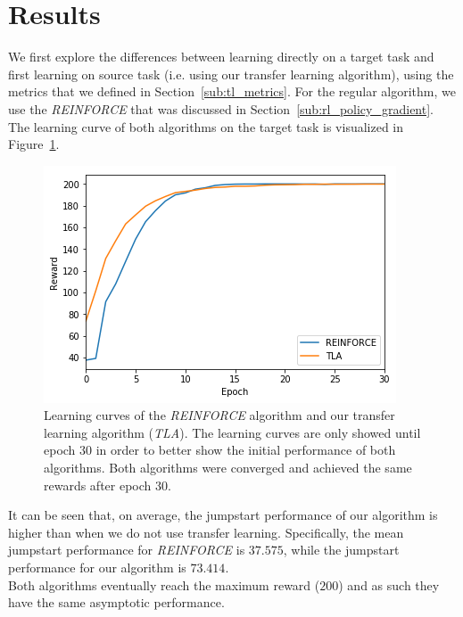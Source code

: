 \documentclass[a4paper, 11pt]{article}
\begin{document}
\section{Results}
We first explore the differences between learning directly on a target task and first learning on source task (i.e. using our transfer learning algorithm), using the metrics that we defined in Section~\ref{sub:tl_metrics}. For the regular algorithm, we use the \textit{REINFORCE} that was discussed in Section~\ref{sub:rl_policy_gradient}. The learning curve of both algorithms on the target task is visualized in Figure~\ref{fig:tla_re_5envs}.
\begin{figure}[H]
    \centering
    \includegraphics[width=.8\linewidth]{images/tla_re_target_5envs.png}
    \caption[Learning curves for \textit{REINFORCE} and \textit{TLA}]{Learning curves of the \textit{REINFORCE} algorithm and our transfer learning algorithm (\textit{TLA}). The learning curves are only showed until epoch 30 in order to better show the initial performance of both algorithms. Both algorithms were converged and achieved the same rewards after epoch 30.}
    \label{fig:tla_re_5envs}
\end{figure}
It can be seen that, on average, the jumpstart performance of our algorithm is higher than when we do not use transfer learning.
Specifically, the mean jumpstart performance for \textit{REINFORCE} is $37.575$, while the jumpstart performance for our algorithm is $73.414$.\\
Both algorithms eventually reach the maximum reward ($200$) and as such they have the same asymptotic performance.\\
\end{document}
